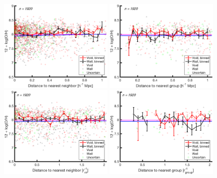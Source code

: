 \begin{figure}
    \includegraphics[width=0.49\textwidth]{Images/smallScaleEnvironment/1sig_dwarf_I06relations_absDist_OH}
    \includegraphics[width=0.49\textwidth]{Images/smallScaleEnvironment/1sig_dwarf_I06relations_groupAbsDist_OH}
    \includegraphics[width=0.49\textwidth]{Images/smallScaleEnvironment/1sig_dwarf_I06relations_virDist_OH}
    \includegraphics[width=0.49\textwidth]{Images/smallScaleEnvironment/1sig_dwarf_I06relations_groupRDist_OH}

\end{figure}
